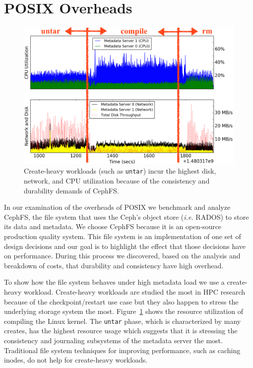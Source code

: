 \section{POSIX Overheads}
\label{sec:posix-overheads}

\begin{figure}[tb]
\centering
\includegraphics[width=1\linewidth]{./graphs/overhead-creates.png}
\caption{Create-heavy workloads (such as \texttt{untar}) incur the highest disk, network, and
CPU utilization because of the consistency and durability demands of
CephFS.}\label{fig:overhead-creates}
\end{figure}

In our examination of the overheads of POSIX we benchmark and analyze CephFS,
the file system that uses the Ceph's object store ({\it i.e.} RADOS) to store
its data and metadata. We choose CephFS because it is an open-source production
quality system. This file system is an implementation of one set of design
decisions and our goal is to highlight the effect that those decisions have on
performance. During this process we discovered, based on the analysis and
breakdown of costs, that durability and consistency have high overhead.

To show how the file system behaves under high metadata load we use a
create-heavy workload. Create-heavy workloads are studied the most in HPC
research because of the checkpoint/restart use case but they also happen to
stress the underlying storage system the most.
Figure~\ref{fig:overhead-creates} shows the resource utilization of compiling
the Linux kernel.  The \texttt{untar} phase, which is characterized by many creates, has
the highest resource usage which suggests that it is stressing the consistency
and journaling subsystems of the metadata server the most. Traditional file
system techniques for improving performance, such as caching inodes, do not
help for create-heavy workloads.

